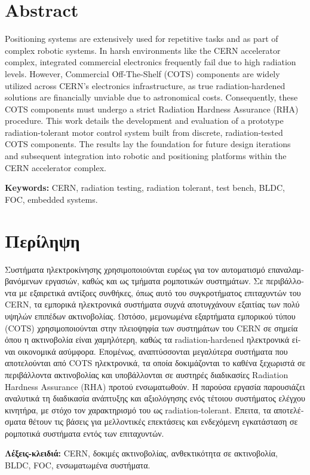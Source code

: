 \chapter*{Abstract}

Positioning systems are extensively used for repetitive tasks and as part of complex robotic systems. In harsh environments like the CERN accelerator complex, integrated commercial electronics frequently fail due to high radiation levels. However, Commercial Off-The-Shelf (COTS) components are widely utilized across CERN's electronics infrastructure, as true radiation-hardened solutions are financially unviable due to astronomical costs. Consequently, these COTS components must undergo a strict Radiation Hardness Assurance (RHA) procedure. This work details the development and evaluation of a prototype radiation-tolerant motor control system built from discrete, radiation-tested COTS components. The results lay the foundation for future design iterations and subsequent integration into robotic and positioning platforms within the CERN accelerator complex.

\vspace{1em}
\textbf{Keywords:} CERN, radiation testing, radiation tolerant, test bench, BLDC, FOC, embedded systems.

\chapter*{Περίληψη}

\begin{greek}
Συστήματα ηλεκτροκίνησης χρησιμοποιούνται ευρέως για τον αυτοματισμό επαναλαμβανόμενων εργασιών, καθώς και ως τμήματα ρομποτικών συστημάτων. Σε περιβάλλοντα με εξαιρετικά αντίξοες συνθήκες, όπως αυτό του συγκροτήματος επιταχυντών του CERN, τα εμπορικά ηλεκτρονικά συστήματα συχνά αποτυγχάνουν εξαιτίας των πολύ υψηλών επιπέδων ακτινοβολίας. Ωστόσο, μεμονωμένα εξαρτήματα εμπορικού τύπου (COTS) χρησιμοποιούνται στην πλειοψηφία των συστημάτων του CERN σε σημεία όπου η ακτινοβολία είναι χαμηλότερη, καθώς τα radiation-hardened ηλεκτρονικά είναι οικονομικά ασύμφορα. Επομένως, αναπτύσσονται μεγαλύτερα συστήματα που αποτελούνται από COTS ηλεκτρονικά, τα οποία δοκιμάζονται το καθένα ξεχωριστά σε περιβάλλοντα ακτινοβολίας και υποβάλλονται σε αυστηρές διαδικασίες Radiation Hardness Assurance (RHA) προτού ενσωματωθούν. Η παρούσα εργασία παρουσιάζει αναλυτικά τη διαδικασία ανάπτυξης και αξιολόγησης ενός τέτοιου συστήματος ελέγχου κινητήρα, με στόχο τον χαρακτηρισμό του ως radiation-tolerant. Έπειτα, τα αποτελέσματα θέτουν τις βάσεις για μελλοντικές επεκτάσεις και ενδεχόμενη εγκατάσταση σε ρομποτικά συστήματα εντός των επιταχυντών.

\vspace{1em}
\textbf{Λέξεις-κλειδιά:} CERN, δοκιμές ακτινοβολίας, ανθεκτικότητα σε ακτινοβολία, BLDC, FOC, ενσωματωμένα συστήματα.
\end{greek}

\clearpage